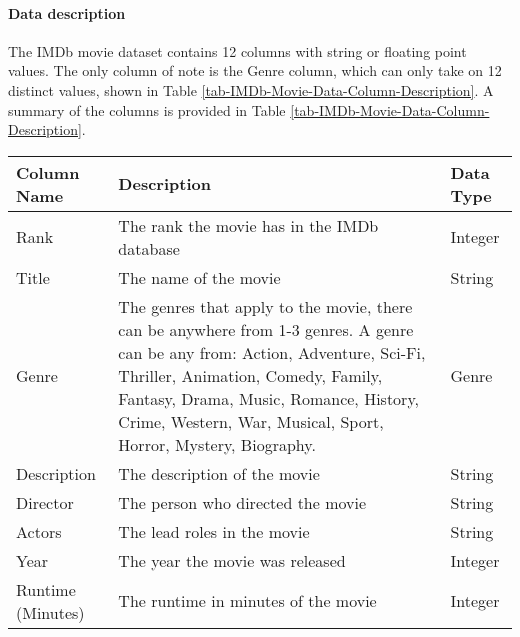     \paragraph{Data description}
        The IMDb movie dataset contains 12 columns with string or floating point
            values.
        The only column of note is the Genre column, which can only take on 12 distinct
            values, shown in Table \ref*{tab-IMDb-Movie-Data-Column-Description}.
        A summary of the columns is provided in Table
            \ref*{tab-IMDb-Movie-Data-Column-Description}.
        \begin{table}[h]
            \centering
            \begin{tabular}{lp{10cm}l}
                \toprule
                Column Name        & Description                                                                & Data Type \\
                \midrule
                Rank               & The rank the movie has in the IMDb database                                & Integer   \\
                Title              & The name of the movie                                                      & String    \\
                Genre              & The genres that apply to the movie, there can be anywhere from 1-3 genres.
                A genre can be any from: Action, Adventure, Sci-Fi, Thriller, Animation,
                    Comedy, Family, Fantasy, Drama, Music, Romance, History, Crime, Western, War,
                    Musical, Sport, Horror, Mystery, Biography.
                                   & Genre                                                                                  \\
                Description        & The description of the movie                                               & String    \\
                Director           & The person who directed the movie                                          & String    \\
                Actors             & The lead roles in the movie                                                & String    \\
                Year               & The year the movie was released                                            & Integer   \\
                Runtime (Minutes)  & The runtime in minutes of the movie                                        & Integer   \\

\end{tabular}
\end{table}
